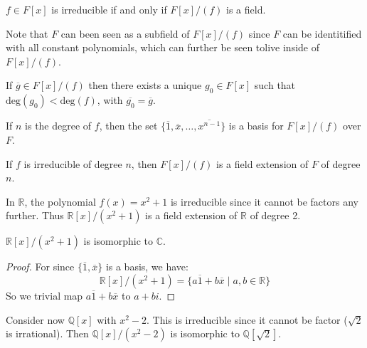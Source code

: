 \documentclass{article}                                                        %
\begin{document}
            \begin{theorem}
                $f\in{F}[x]$ is irreducible if and only if $F[x]/(f)$ is a
                field.
            \end{theorem}
            Note that $F$ can been seen as a subfield of $F[x]/(f)$ since
            $F$ can be identitified with all constant polynomials, which can
            further be seen tolive inside of $F[x]/(f)$.
            \begin{theorem}
                If $\overline{g}\in{F}[x]/(f)$ then there exists a unique
                $g_{0}\in{F}[x]$ such that$\textrm{deg}(g_{0})<\textrm{deg}(f)$,
                with $\overline{g_{0}}=\overline{g}$.
            \end{theorem}
            If $n$ is the degree of $f$, then the set
            $\{\overline{1},\overline{x},\dots,\overline{x^{n-1}}\}$ is a basis
            for $F[x]/(f)$ over $F$.
            \begin{theorem}
                If $f$ is irreducible of degree $n$, then
                $F[x]/(f)$ is a field extension of $F$ of degree $n$.
            \end{theorem}
            \begin{example}
                In $\mathbb{R}$, the polynomial $f(x)=x^{2}+1$ is irreducible
                since it cannot be factors any further. Thus
                $\mathbb{R}[x]/(x^{2}+1)$ is a field extension of $\mathbb{R}$
                of degree 2.
            \end{example}
            \begin{theorem}
                $\mathbb{R}[x]/(x^{2}+1)$ is isomorphic to $\mathbb{C}$.
            \end{theorem}
            \begin{proof}
                For since $\{\overline{1},\overline{x}\}$ is a basis, we have:
                \begin{equation}
                    \mathbb{R}[x]/(x^{2}+1)=
                        \{a\overline{1}+b\overline{x}\;|\;a,b\in\mathbb{R}\}
                \end{equation}
                So we trivial map $a\overline{1}+b\overline{x}$ to $a+bi$.
            \end{proof}
            \begin{example}
                Consider now $\mathbb{Q}[x]$ with $x^{2}-2$. This is irreducible
                since it cannot be factor ($\sqrt{2}$ is irrational). Then
                $\mathbb{Q}[x]/(x^{2}-2)$ is isomorphic to
                $\mathbb{Q}[\sqrt{2}]$.
            \end{example}
\end{document}

